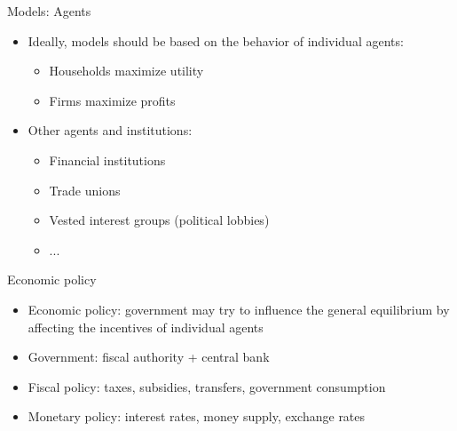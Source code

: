 \documentclass[10pt,handout]{beamer}
\begin{document}
\begin{frame}{Models: Agents}
\begin{itemize}
    \item Ideally, models should be based on the behavior of individual agents:
    \begin{itemize}
        \item Households maximize utility
        \item Firms maximize profits
    \end{itemize}\medskip
    \item Other agents and institutions:
    \begin{itemize}
        \item Financial institutions\smallskip
        \item Trade unions\smallskip
        \item Vested interest groups (political lobbies)\smallskip
        \item ...
    \end{itemize}
\end{itemize}
\end{frame}


\begin{frame}{Economic policy}
\begin{itemize}
    \item Economic policy: government may try to influence the general equilibrium by affecting the incentives of individual agents\medskip
    \item Government: fiscal authority + central bank\medskip
    \item Fiscal policy: taxes, subsidies, transfers, government consumption\medskip
    \item Monetary policy: interest rates, money supply, exchange rates
\end{itemize}
\end{frame}
\end{document}

